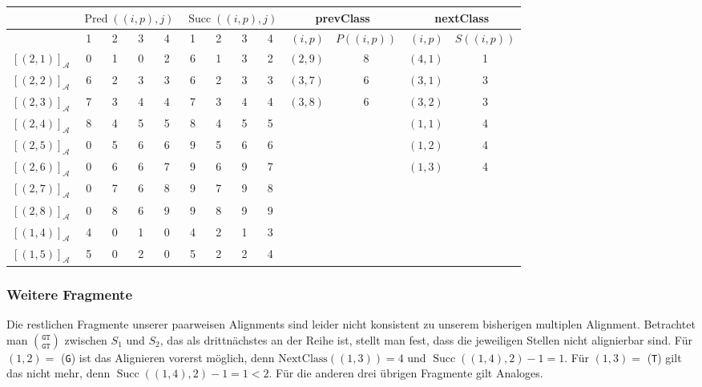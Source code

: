 \begin{tabular}{|r|cccc|cccc||r|c|r|c|}
	\hline
	& \multicolumn{4}{c|}{$\operatorname{Pred}((i,p),j)$} & \multicolumn{4}{c||}{$\operatorname{Succ}((i,p),j)$} & \multicolumn{2}{c|}{\textrm{prevClass}} & \multicolumn{2}{c}{\textrm{nextClass}} \\ \hline
	\diagbox[dir=NW]{$(i,p)$}{$j$} & 1 & 2 & 3 & 4 & 1 & 2 & 3 & 4 & $(i,p)$ & $P((i,p))$ & $(i,p)$ & $S((i,p))$ \\ \hline
	$[(2,1)]_{\mathcal{A}}$ & 0 & 1 & 0 & 2 & 6 & 1 & 3 & 2 & $(2,9)$ & 8 & $(4,1)$ & 1 \\
	$[(2,2)]_{\mathcal{A}}$ & 6 & 2 & 3 & 3 & 6 & 2 & 3 & 3 & $(3,7)$ & 6 & $(3,1)$ & 3 \\
	$[(2,3)]_{\mathcal{A}}$ & 7 & 3 & 4 & 4 & 7 & 3 & 4 & 4 & $(3,8)$ & 6 & $(3,2)$ & 3 \\
	$[(2,4)]_{\mathcal{A}}$ & 8 & 4 & 5 & 5 & 8 & 4 & 5 & 5 & & & $(1,1)$ & 4 \\
	$[(2,5)]_{\mathcal{A}}$ & 0 & 5 & 6 & 6 & 9 & 5 & 6 & 6 & & & $(1,2)$ & 4 \\
	$[(2,6)]_{\mathcal{A}}$ & 0 & 6 & 6 & 7 & 9 & 6 & 9 & 7 & & & $(1,3)$ & 4 \\
	$[(2,7)]_{\mathcal{A}}$ & 0 & 7 & 6 & 8 & 9 & 7 & 9 & 8 & & & & \\
	$[(2,8)]_{\mathcal{A}}$ & 0 & 8 & 6 & 9 & 9 & 8 & 9 & 9 & & & & \\
	$[(1,4)]_{\mathcal{A}}$ & 4 & 0 & 1 & 0 & 4 & 2 & 1 & 3 & & & & \\
	$[(1,5)]_{\mathcal{A}}$ & 5 & 0 & 2 & 0 & 5 & 2 & 2 & 4 & & & & \\
	\hline
\end{tabular}
\normalsize

\subsubsection{Weitere Fragmente}

Die restlichen Fragmente unserer paarweisen Alignments sind leider nicht konsistent zu unserem bisherigen multiplen Alignment. Betrachtet man ${\texttt{GT}}\choose{\texttt{GT}}$ zwischen $S_1$ und $S_2$, das als drittnächstes an der Reihe ist, stellt man fest, dass die jeweiligen Stellen nicht alignierbar sind. Für $(1,2) =$ (\texttt{G}) ist das Alignieren vorerst möglich, denn $\textrm{NextClass}((1,3)) = 4$ und $\operatorname{Succ}((1,4),2) - 1 = 1$. Für $(1,3) =$ (\texttt{T}) gilt das nicht mehr, denn $\operatorname{Succ}((1,4),2) - 1 = 1 < 2$. Für die anderen drei übrigen Fragmente gilt Analoges.

